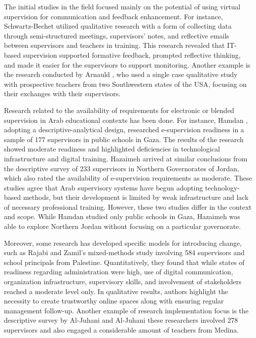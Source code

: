 \documentclass[10pt]{NSP1}
\begin{document}
The initial studies in the field focused mainly on the potential of using virtual supervision for communication and feedback enhancement. For instance, Schwartz-Bechet \cite{ref25} utilized qualitative research with a form of collecting data through semi-structured meetings, supervisors' notes, and reflective emails between supervisors and teachers in training. This research revealed that IT-based supervision supported formative feedback, prompted reflective thinking, and made it easier for the supervisors to support monitoring. Another example is the research conducted by Arnauld \cite{ref26}, who used a single case qualitative study with prospective teachers from two Southwestern states of the USA, focusing on their exchanges with their supervisors.

Research related to the availability of requirements for electronic or blended supervision in Arab educational contexts has been done. For instance, Hamdan \cite{ref27}, adopting a descriptive-analytical design, researched e-supervision readiness in a sample of 177 supervisors in public schools in Gaza. The results of the research showed moderate readiness and highlighted deficiencies in technological infrastructure and digital training. Hazaimeh \cite{ref18}arrived at similar conclusions from the descriptive survey of 233 supervisors in Northern Governorates of Jordan, which also rated the availability of e-supervision requirements as moderate. These studies agree that Arab supervisory systems have begun adopting technology-based methods, but their development is limited by weak infrastructure and lack of necessary professional training. However, these two studies differ in the context and scope. While Hamdan studied only public schools in Gaza, Hazaimeh was able to explore Northern Jordan without focusing on a particular governorate.

Moreover, some research has developed specific models for introducing change, such as Rajabi and Zamil's \cite{ref23} mixed-methods study involving 584 supervisors and school principals from Palestine. Quantitatively, they found that while states of readiness regarding administration were high, use of digital communication, organization infrastructure, supervisory skills, and involvement of stakeholders reached a moderate level only. In qualitative results, authors highlight the necessity to create trustworthy online spaces along with ensuring regular management follow-up. Another example of research implementation focus is the descriptive survey by Al-Juhani and Al-Juhani \cite{ref28} these researchers involved 278 supervisors and also engaged a considerable amount of teachers from Medina.
\end{document}
